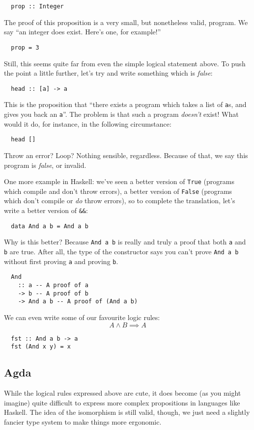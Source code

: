 \documentclass[twocolumn]{article}
\theoremstyle{definition}
\theoremstyle{definition}
\begin{document}
\begin{verbatim}
  prop :: Integer
\end{verbatim}

The proof of this proposition is a very small, but nonetheless valid, program.
We say ``an integer does exist. Here's one, for example!''

\begin{verbatim}
  prop = 3
\end{verbatim}

Still, this seems quite far from even the simple logical statement above. To
push the point a little further, let's try and write something which is
\emph{false}:
\begin{verbatim}
  head :: [a] -> a
\end{verbatim}
This is the proposition that ``there exists a program which takes a list of
\verb+a+s, and gives you back an \verb+a+''. The problem is that such a program
\emph{doesn't} exist! What would it do, for instance, in the following
circumstance:
\begin{verbatim}
  head []
\end{verbatim}
Throw an error? Loop? Nothing sensible, regardless. Because of that, we say this
program is \emph{false}, or invalid.

One more example in Haskell: we've seen a better version of \verb+True+
(programs which compile and don't throw errors), a better version of
\verb+False+ (programs which don't compile or \emph{do} throw errors), so to
complete the translation, let's write a better version of \verb+&&+:
\begin{verbatim}
  data And a b = And a b
\end{verbatim}

Why is this better? Because \verb+And a b+ is really and truly a proof that both
\verb+a+ and \verb+b+ are true. After all, the type of the constructor says you
can't prove \verb+And a b+ without first proving \verb+a+ and proving \verb+b+.
\begin{verbatim}
  And
    :: a -- A proof of a
    -> b -- A proof of b
    -> And a b -- A proof of (And a b)
\end{verbatim}
We can even write some of our favourite logic rules:
\[ A \wedge B \implies A \]
\begin{verbatim}
  fst :: And a b -> a
  fst (And x y) = x
\end{verbatim}
\subsection{Agda}
While the logical rules expressed above are cute, it does become (as you might
imagine) quite difficult to express more complex propositions in languages like
Haskell. The idea of the isomorphism is still valid, though, we just need a
slightly fancier type system to make things more ergonomic.
\end{document}
